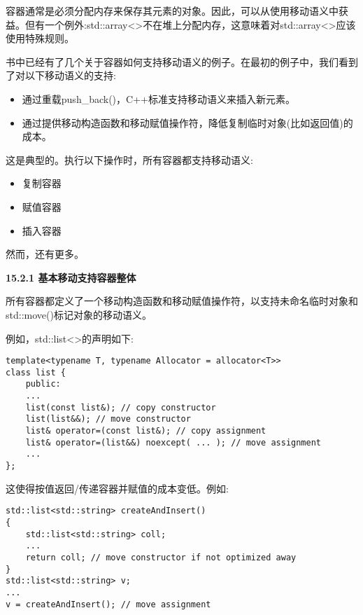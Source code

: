 容器通常是必须分配内存来保存其元素的对象。因此，可以从使用移动语义中获益。但有一个例外:std::array<>不在堆上分配内存，这意味着对std::array<>应该使用特殊规则。\par

书中已经有了几个关于容器如何支持移动语义的例子。在最初的例子中，我们看到了对以下移动语义的支持:\par

\begin{itemize}
	\item 通过重载push\_back()，C++标准支持移动语义来插入新元素。
	\item 通过提供移动构造函数和移动赋值操作符，降低复制临时对象(比如返回值)的成本。
\end{itemize}

这是典型的。执行以下操作时，所有容器都支持移动语义:\par

\begin{itemize}
	\item 复制容器
	\item 赋值容器
	\item 插入容器
\end{itemize}

然而，还有更多。\par

\hspace*{\fill} \par %
\textbf{15.2.1 基本移动支持容器整体}

所有容器都定义了一个移动构造函数和移动赋值操作符，以支持未命名临时对象和std::move()标记对象的移动语义。\par

例如，std::list<>的声明如下:\par

\begin{lstlisting}[caption={}]
template<typename T, typename Allocator = allocator<T>>
class list {
	public:
	...
	list(const list&); // copy constructor
	list(list&&); // move constructor
	list& operator=(const list&); // copy assignment
	list& operator=(list&&) noexcept( ... ); // move assignment
	...
};
\end{lstlisting}

这使得按值返回/传递容器并赋值的成本变低。例如:\par

\begin{lstlisting}[caption={}]
std::list<std::string> createAndInsert()
{
	std::list<std::string> coll;
	...
	return coll; // move constructor if not optimized away
}
std::list<std::string> v;
...
v = createAndInsert(); // move assignment
\end{lstlisting}

